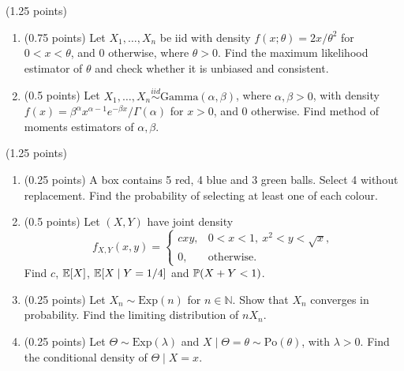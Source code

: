 \documentclass[a4paper]{report}
\begin{document}
\begin{problem} (1.25 points)
\begin{enumerate}
\item (0.75 points) Let $X_1,\ldots,X_n$ be iid with density $f(x;\theta)=2x/\theta^2$ for $0<x<\theta$, and 0 otherwise, where $\theta>0$. Find the maximum likelihood estimator of $\theta$ and check whether it is unbiased and consistent.
\item (0.5 points) Let $X_1,\ldots,X_n\overset{iid}{\sim}\mathrm{Gamma}(\alpha,\beta)$, where $\alpha,\beta>0$, with density $f(x)=\beta^\alpha x^{\alpha-1}e^{-\beta x}/\Gamma(\alpha)$ for $x>0$, and 0 otherwise. Find method of moments estimators of $\alpha,\beta$.
\end{enumerate}
\end{problem}
\begin{problem} (1.25 points)~
\begin{enumerate}
\item (0.25 points) A box contains 5 red, 4 blue and 3 green balls. Select 4 without replacement. Find the probability of selecting at least one of each colour.
\item (0.5 points) Let $(X,Y)$ have joint density
\[f_{X,Y}(x,y)=\begin{cases}cxy,&0<x<1,\ x^2<y<\sqrt x,\\0,&\text{otherwise.}\end{cases}\]
Find $c$, $\E[X]$, $\E[X\mid Y=1/4]$ and $\P(X+Y<1)$.
\item (0.25 points) Let $X_n\sim\mathrm{Exp}(n)$ for $n\in\mathbb N$. Show that $X_n$ converges in probability. Find the limiting distribution of $nX_n$.
\item (0.25 points) Let $\Theta\sim\mathrm{Exp}(\lambda)$ and $X\mid\Theta=\theta\sim\mathrm{Po}(\theta)$, with $\lambda>0$. Find the conditional density of $\Theta\mid X=x$.
\end{enumerate}
\end{problem}
\end{document}
